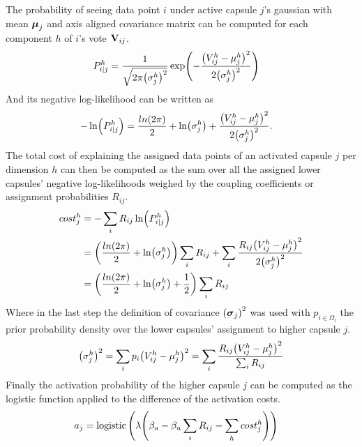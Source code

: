 The probability of seeing data point $i$ under active capsule $j$'s gaussian with mean $\vb*{\mu}_j$ and axis aligned covariance matrix can be computed for each component $h$ of $i$'s vote $\vb{V}_{ij}$.
\begin{align}
    P_{i|j}^h &= \frac{1}{\sqrt{2\pi\qty(\sigma_j^h)^2}}\exp(-\frac{\qty(V_{ij}^h-\mu_j^h)^2}{2\qty(\sigma_j^h)^2})
\end{align}
And its negative log-likelihood can be written as
\begin{align}
    -\ln(P_{i|j}^h) &= \frac{ln(2\pi)}{2}+\ln(\sigma_j^h)+\frac{\qty(V_{ij}^h-\mu_j^h)^2}{2\qty(\sigma_j^h)^2}.
\end{align}
The total cost of explaining the assigned data points of an activated capsule $j$ per dimension $h$ can then be computed as the sum over all the assigned lower capsules' negative log-likelihoods weighed by the coupling coefficients or assignment probabilities $R_{ij}$.
\begin{align}
    cost_j^h &= - \sum_i R_{ij} \ln(P_{i|j}^h)\\
    &= \qty(\frac{ln(2\pi)}{2}+\ln(\sigma_j^h))\sum_i R_{ij}+\sum_i\frac{R_{ij}\qty(V_{ij}^h-\mu_j^h)^2}{2\qty(\sigma_j^h)^2}\\
    &= \qty(\frac{ln(2\pi)}{2}+\ln(\sigma_j^h) + \frac{1}{2})\sum_i R_{ij}
\end{align}
Where in the last step the definition of covariance $\qty(\vb*{\sigma}_j)^2$ was used with $p_{i\in\Omega_l}$ the prior probability density over the lower capsules' assignment to higher capsule $j$.
\begin{align}
    \qty(\sigma_j^h)^2 = \sum_i p_i\qty(V_{ij}^h-\mu_j^h)^2 = \sum_i\frac{R_{ij} \qty(V_{ij}^h-\mu_j^h)^2}{\sum_i R_{ij}}
\end{align}
Finally the activation probability of the higher capsule $j$ can be computed as the logistic function applied to the difference of the activation costs.
\begin{align*}
    a_j &= \operatorname{logistic}\qty(\lambda\qty(\beta_a-\beta_u\sum_i R_{ij}-\sum_h cost_j^h))
\end{align*}

